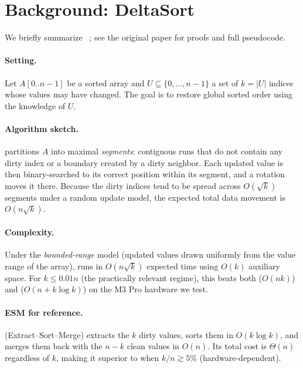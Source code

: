 \section{Background: DeltaSort}
\label{sec:background}

We briefly summarize \DeltaSort~\cite{deltasort}; see the original paper for
proofs and full pseudocode.

\paragraph{Setting.}
Let $A[0..n-1]$ be a sorted array and $U \subseteq \{0,\dots,n-1\}$ a set of
$k = |U|$ indices whose values may have changed.
The goal is to restore global sorted order using the knowledge of $U$.

\paragraph{Algorithm sketch.}
\DeltaSort partitions $A$ into maximal \emph{segments}: contiguous runs
that do not contain any dirty index or a boundary created by a dirty neighbor.
Each updated value is then binary-searched to its correct position within its
segment, and a rotation moves it there.
Because the dirty indices tend to be spread across $O(\sqrt{k})$ segments
under a random update model, the expected total data movement is $O(n\sqrt{k})$.

\paragraph{Complexity.}
Under the \emph{bounded-range} model (updated values drawn uniformly from the
value range of the array), \DeltaSort runs in $O(n\sqrt{k})$ expected time
using $O(k)$ auxiliary space.
For $k \leq 0.01n$ (the practically relevant regime), this beats both
\BIS ($O(nk)$) and \ESM ($O(n + k\log k)$) on the M3 Pro hardware we test.

\paragraph{ESM for reference.}
\ESM (Extract–Sort–Merge) extracts the $k$ dirty values, sorts them in
$O(k \log k)$, and merges them back with the $n-k$ clean values in $O(n)$.
Its total cost is $\Theta(n)$ regardless of $k$, making it superior to
\DeltaSort when $k/n \gtrsim 5\%$ (hardware-dependent).
